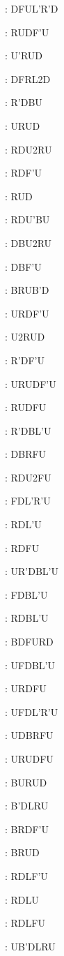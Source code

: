 \documentclass[9pt]{article}
\begin{document}
{\begin{multicols}{6}
: DFUL'R'D

: RUDF'U

: U'RUD

: DFRL2D

: R'DBU

: URUD

: RDU2RU

: RDF'U

: RUD

: RDU'BU

: DBU2RU

: DBF'U

: BRUB'D

: URDF'U

: U2RUD

: R'DF'U

: URUDF'U

: RUDFU

: R'DBL'U

: DBRFU

: RDU2FU

: FDL'R'U

: RDL'U

: RDFU

: UR'DBL'U

: FDBL'U

: RDBL'U

: BDFURD

: UFDBL'U

: URDFU

: UFDL'R'U

: UDBRFU

: URUDFU

: BURUD

: B'DLRU

: BRDF'U

: BRUD

: RDLF'U

: RDLU

: RDLFU

: UB'DLRU


\end{multicols}}
\end{document}
